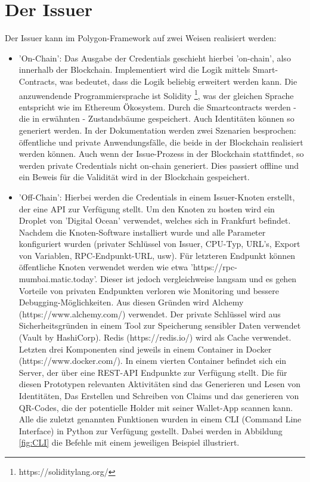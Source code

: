 \section{Der Issuer}
Der Issuer kann im Polygon-Framework auf zwei Weisen realisiert werden:
\begin{itemize}
	\item 'On-Chain': Das Ausgabe der Credentials geschieht hierbei 'on-chain', also innerhalb der Blockchain. Implementiert wird die Logik mittels Smart-Contracts, was bedeutet, dass die Logik beliebig erweitert werden kann. Die anzuwendende Programmiersprache ist Solidity \footnote{https://soliditylang.org/}, was der gleichen Sprache entspricht wie im Ethereum Ökosystem. Durch die Smartcontracts werden - die in  erwähnten - Zustandsbäume gespeichert. Auch Identitäten können so generiert  werden. In der Dokumentation werden zwei Szenarien besprochen: öffentliche und private Anwendungsfälle, die beide in der Blockchain realisiert werden können. Auch wenn der Issue-Prozess in der Blockchain stattfindet, so werden private Credentials nicht on-chain generiert. Dies passiert offline und ein Beweis für die Validität wird in der Blockchain gespeichert.
	\item  'Off-Chain': Hierbei werden die Credentials in einem Issuer-Knoten erstellt, der eine API zur Verfügung stellt. Um den Knoten zu hosten wird ein Droplet von 'Digital Ocean' verwendet,  welches sich in Frankfurt befindet. Nachdem die Knoten-Software installiert wurde und alle Parameter konfiguriert wurden (privater Schlüssel von Issuer, CPU-Typ, URL's, Export von Variablen, RPC-Endpunkt-URL, usw). Für letzteren Endpunkt können öffentliche Knoten verwendet werden wie etwa 'https://rpc-mumbai.matic.today'. Dieser ist jedoch vergleichweise langsam und es gehen Vorteile von privaten Endpunkten verloren wie Monitoring und bessere Debugging-Möglichkeiten. Aus diesen Gründen wird Alchemy (https://www.alchemy.com/) verwendet. Der private Schlüssel wird aus Sicherheitsgründen in einem Tool zur Speicherung sensibler Daten verwendet (Vault by HashiCorp). Redis (https://redis.io/) wird als Cache verwendet. Letzten drei Komponenten sind jeweils in einem Container in Docker (https://www.docker.com/). In einem vierten Container befindet sich ein Server, der über eine REST-API Endpunkte zur Verfügung stellt. Die für diesen Prototypen relevanten Aktivitäten sind das Generieren und Lesen von Identitäten, Das Erstellen und Schreiben von Claims und das generieren von QR-Codes, die der potentielle Holder mit seiner Wallet-App scannen kann. Alle die zuletzt genannten Funktionen wurden in einem CLI (Command Line Interface) in Python zur Verfügung gestellt. Dabei werden in Abbildung \ref{fig:CLI} die Befehle mit einem jeweiligen Beispiel illustriert.
	

\end{itemize}
